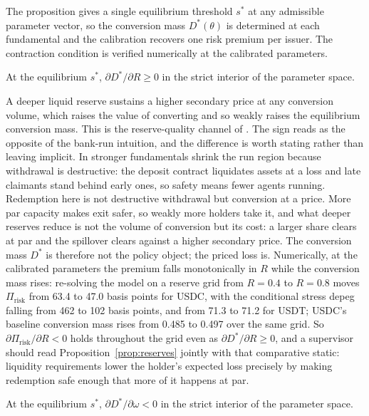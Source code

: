 The proposition gives a single equilibrium threshold $s^*$ at any admissible parameter vector, so the conversion mass $D^*(\theta)$ is determined at each fundamental and the calibration recovers one risk premium per issuer. The contraction condition is verified numerically at the calibrated parameters.

\begin{proposition}\label{prop:reserves}
At the equilibrium $s^*$, $\partial D^*/\partial R \geq 0$ in the strict interior of the parameter space.
\end{proposition}

A deeper liquid reserve sustains a higher secondary price at any conversion volume, which raises the value of converting and so weakly raises the equilibrium conversion mass. This is the reserve-quality channel of \citet{ma_zeng_zhang_2025}. The sign reads as the opposite of the bank-run intuition, and the difference is worth stating rather than leaving implicit. In \citet{goldstein_pauzner_2005_demand_deposits} stronger fundamentals shrink the run region because withdrawal is destructive: the deposit contract liquidates assets at a loss and late claimants stand behind early ones, so safety means fewer agents running. Redemption here is not destructive withdrawal but conversion at a price. More par capacity makes exit safer, so weakly more holders take it, and what deeper reserves reduce is not the volume of conversion but its cost: a larger share clears at par and the spillover clears against a higher secondary price. The conversion mass $D^*$ is therefore not the policy object; the priced loss is. Numerically, at the calibrated parameters the premium falls monotonically in $R$ while the conversion mass rises: re-solving the model on a reserve grid from $R=0.4$ to $R=0.8$ moves $\Pi_{\text{risk}}$ from 63.4 to 47.0 basis points for USDC, with the conditional stress depeg falling from 462 to 102 basis points, and from 71.3 to 71.2 for USDT; USDC's baseline conversion mass rises from 0.485 to 0.497 over the same grid. So $\partial \Pi_{\text{risk}}/\partial R < 0$ holds throughout the grid even as $\partial D^*/\partial R \geq 0$, and a supervisor should read Proposition~\ref{prop:reserves} jointly with that comparative static: liquidity requirements lower the holder's expected loss precisely by making redemption safe enough that more of it happens at par.

\begin{proposition}\label{prop:convenience}
At the equilibrium $s^*$, $\partial D^*/\partial \omega < 0$ in the strict interior of the parameter space.
\end{proposition}

